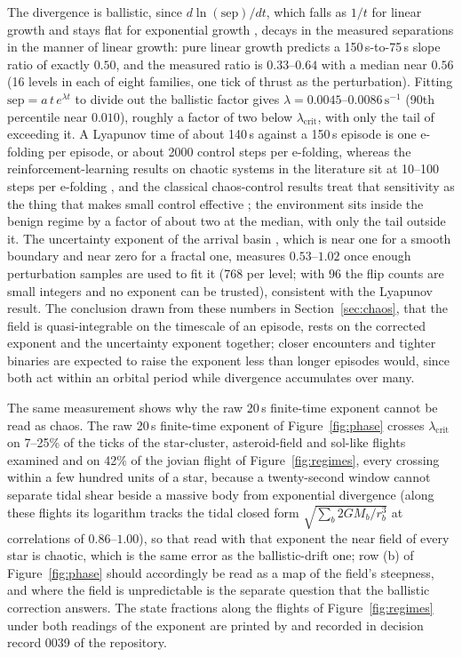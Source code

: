 The divergence is ballistic, since $d\ln(\mathrm{sep})/dt$, which falls as
$1/t$ for linear growth and stays flat for exponential growth
\cite{benettin1980,ott2002}, decays in the measured separations in the
manner of linear growth: pure linear growth predicts a 150\,s-to-75\,s slope
ratio of exactly $0.50$, and the measured ratio is $0.33$--$0.64$ with a
median near $0.56$ (16 levels in each of eight families, one tick of thrust
as the perturbation). Fitting $\mathrm{sep} = a\,t\,e^{\lambda t}$ to divide
out the ballistic factor gives $\lambda = 0.0045$--$0.0086\,\mathrm{s}^{-1}$
(90th percentile near $0.010$), roughly a factor of two below
$\lambda_{\mathrm{crit}}$, with only the tail of 
exceeding it. A Lyapunov time of about 140\,s against a 150\,s episode is one
e-folding per episode, or about 2000 control steps per e-folding, whereas
the reinforcement-learning results on chaotic systems in the literature sit
at 10--100 steps per e-folding \cite{bucci2019,rabault2019,vignon2023}, and
the classical chaos-control results treat that sensitivity as the thing that
makes small control effective \cite{ott1990,shinbrot1990}; the environment
sits inside the benign regime by a factor of about two at the median, with
only the  tail outside it. The uncertainty exponent of the arrival
basin \cite{grebogi1983,mcdonald1985,aguirre2009}, which is near one for a
smooth boundary and near zero for a fractal one, measures $0.53$--$1.02$
once enough perturbation samples are used to fit it (768 per level; with 96
the flip counts are small integers and no exponent can be trusted),
consistent with the Lyapunov result. The conclusion drawn from these numbers in Section~\ref{sec:chaos}, that the
field is quasi-integrable on the timescale of an episode, rests on the
corrected exponent and the uncertainty exponent together; closer encounters
and tighter binaries are expected to raise the exponent less than longer
episodes would, since both act within an orbital period while divergence
accumulates over many.

The same measurement shows why the raw 20\,s finite-time exponent cannot
be read as chaos. The raw 20\,s finite-time exponent of Figure~\ref{fig:phase} crosses
$\lambda_{\mathrm{crit}}$ on 7--25\% of the ticks of the star-cluster,
asteroid-field and sol-like flights examined and on 42\% of the jovian
flight of Figure~\ref{fig:regimes},
every crossing within a few hundred units of a star, because a twenty-second
window cannot separate tidal shear beside a massive body from exponential
divergence (along these flights its logarithm tracks the tidal closed form
$\sqrt{\sum_b 2GM_b/r_b^3}$ at correlations of $0.86$--$1.00$), so that read
with that exponent the near field of every star is chaotic, which is the same error as the ballistic-drift one; row (b) of Figure~\ref{fig:phase}
should accordingly be read as a map of the field's steepness, and where the
field is unpredictable is the separate question that the ballistic
correction answers.
The state fractions along the flights of Figure~\ref{fig:regimes} under both
readings of the exponent are printed by 
and recorded in decision record 0039 of the repository.
